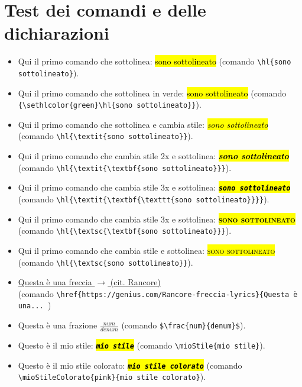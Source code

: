 \documentclass{report}
\newcommand{\mioStile}[1] {
    \hl{\textit{\textbf{\texttt{#1}}}}
}
\newcommand{\mioStileColorato}[2] {
    {\sethlcolor{#1}\mioStile{#2}}
}
\begin{document}
        \section{Test dei comandi e delle dichiarazioni}
            \begin{itemize}
                \item Qui il primo comando che sottolinea: \hl{sono sottolineato} (comando \verb!\hl{sono sottolineato}!).
                \item Qui il primo comando che sottolinea in verde: {\hl{sono sottolineato}} (comando \verb!{\sethlcolor{green}\hl{sono sottolineato}}!). %
                \item Qui il primo comando che sottolinea e cambia stile: \hl{\textit{sono sottolineato}} (comando \verb!\hl{\textit{sono sottolineato}}!).
                \item Qui il primo comando che cambia stile 2x e sottolinea: \hl{\textit{\textbf{sono sottolineato}}} (comando \verb!\hl{\textit{\textbf{sono sottolineato}}}!).
                \item Qui il primo comando che cambia stile 3x e sottolinea: \hl{\textit{\textbf{\texttt{sono sottolineato}}}} (comando \verb!\hl{\textit{\textbf{\texttt{sono sottolineato}}}}!).
                \item Qui il primo comando che cambia stile 3x e sottolinea: \hl{\textsc{\textbf{sono sottolineato}}} (comando \verb!\hl{\textsc{\textbf{sono sottolineato}}}!).
                \item Qui il primo comando che cambia stile e sottolinea: \hl{\textsc{sono sottolineato}} (comando \verb!\hl{\textsc{sono sottolineato}}!).
                \item \href{https://genius.com/Rancore-freccia-lyrics}{Questa è una freccia $\rightarrow$ (cit. Rancore)} \\
                    (comando \verb!\href{https://genius.com/Rancore-freccia-lyrics}{Questa è una... !)      
                \item Questa è una frazione $\frac{num}{denum}$ (comando \verb!$\frac{num}{denum}$!).
                \item Questo è il mio stile: \mioStile{mio stile} (comando \verb!\mioStile{mio stile}!).
                \item Questo è il mio stile colorato: \mioStileColorato{pink}{mio stile colorato} (comando \verb!\mioStileColorato{pink}{mio stile colorato}!). 
            \end{itemize}
\end{document}
